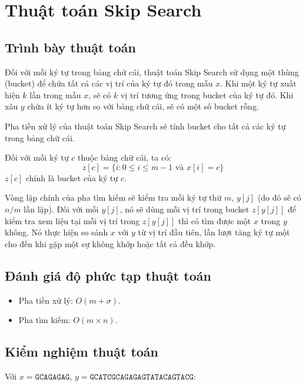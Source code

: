\documentclass[12pt,twoside,openright]{extreport}
\begin{document}
\section{Thuật toán Skip Search}

\subsection{Trình bày thuật toán}

Đối với mỗi ký tự trong bảng chữ cái, thuật toán Skip Search sử dụng một thùng (bucket) để chứa tất cả các vị trí của ký tự đó trong mẫu $x$. Khi một ký tự xuất hiện $k$ lần trong mẫu $x$, sẽ có $k$ vị trí tương ứng trong bucket của ký tự đó. Khi xâu $y$ chứa ít ký tự hơn so với bảng chữ cái, sẽ có một số bucket rỗng.

Pha tiền xử lý của thuật toán Skip Search sẽ tính bucket cho tất cả các ký tự trong bảng chữ cái.

Đối với mỗi ký tự $c$ thuộc bảng chữ cái, ta có:
\[z[c] = \{i : 0 \leq i \leq m-1 \text{ và } x[i] = c\}\]
$z[c]$ chính là bucket của ký tự $c$.

Vòng lặp chính của pha tìm kiếm sẽ kiểm tra mỗi ký tự thứ $m$, $y[j]$ (do đó sẽ có $n/m$ lần lặp). Đối với mỗi $y[j]$, nó sẽ dùng mỗi vị trí trong bucket $z[y[j]]$ để kiểm tra xem liệu tại mỗi vị trí trong $z[y[j]]$ thì có tìm được một $x$ trong $y$ không. Nó thực hiện so sánh $x$ với $y$ từ vị trí đầu tiên, lần lượt tăng ký tự một cho đến khi gặp một sự không khớp hoặc tất cả đều khớp.

\subsection{Đánh giá độ phức tạp thuật toán}

\begin{itemize}
	\item Pha tiền xử lý: $O(m + \sigma)$.
	\item Pha tìm kiếm: $O(m \times n)$.
\end{itemize}

\subsection{Kiểm nghiệm thuật toán}

Với $x = \texttt{GCAGAGAG}$, $y = \texttt{GCATCGCAGAGAGTATACAGTACG}$:
\end{document}
